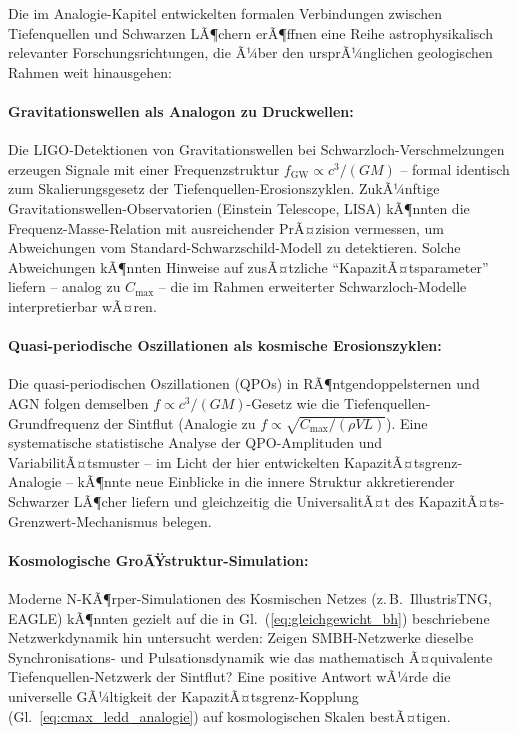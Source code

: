 ﻿\documentclass[12pt,a4paper]{report}
\begin{document}
Die im Analogie-Kapitel entwickelten formalen Verbindungen zwischen Tiefenquellen und Schwarzen LÃ¶chern erÃ¶ffnen eine Reihe astrophysikalisch relevanter Forschungsrichtungen, die Ã¼ber den ursprÃ¼nglichen geologischen Rahmen weit hinausgehen:

\paragraph{Gravitationswellen als Analogon zu Druckwellen:}
Die LIGO-Detektionen von Gravitationswellen bei Schwarzloch-Verschmelzungen \cite{abbott2016ligo} erzeugen Signale mit einer Frequenzstruktur $f_{\mathrm{GW}} \propto c^3/(GM)$ -- formal identisch zum Skalierungsgesetz der Tiefenquellen-Erosionszyklen. ZukÃ¼nftige Gravitationswellen-Observatorien (Einstein Telescope, LISA) kÃ¶nnten die Frequenz-Masse-Relation mit ausreichender PrÃ¤zision vermessen, um Abweichungen vom Standard-Schwarzschild-Modell zu detektieren. Solche Abweichungen kÃ¶nnten Hinweise auf zusÃ¤tzliche ``KapazitÃ¤tsparameter'' liefern -- analog zu $C_{\max}$ -- die im Rahmen erweiterter Schwarzloch-Modelle interpretierbar wÃ¤ren.

\paragraph{Quasi-periodische Oszillationen als kosmische Erosionszyklen:}
Die quasi-perio\-dischen Oszillationen (QPOs) in RÃ¶ntgendoppelsternen \cite{strohmayer2001} und AGN folgen demselben $f \propto c^3/(GM)$-Gesetz wie die Tiefenquellen-Grundfrequenz der Sintflut (Analogie zu $f \propto \sqrt{C_{\max}/(\rho V L)}$). Eine systematische statistische Analyse der QPO-Amplituden und VariabilitÃ¤tsmuster -- im Licht der hier entwickelten KapazitÃ¤tsgrenz-Analogie -- kÃ¶nnte neue Einblicke in die innere Struktur akkretierender Schwarzer LÃ¶cher liefern und gleichzeitig die UniversalitÃ¤t des KapazitÃ¤ts-Grenzwert-Mechanismus belegen.

\paragraph{Kosmologische GroÃŸstruktur-Simulation:}
Moderne N-KÃ¶rper-Simulationen des Kosmischen Netzes (z.\,B.\ IllustrisTNG, EAGLE) kÃ¶nnten gezielt auf die in Gl.~(\ref{eq:gleichgewicht_bh}) beschriebene Netzwerkdynamik hin untersucht werden: Zeigen SMBH-Netzwerke dieselbe Synchronisations- und Pulsationsdynamik wie das mathematisch Ã¤quivalente Tiefenquellen-Netzwerk der Sintflut? Eine positive Antwort wÃ¼rde die universelle GÃ¼ltigkeit der KapazitÃ¤tsgrenz-Kopplung (Gl.~\ref{eq:cmax_ledd_analogie}) auf kosmologischen Skalen bestÃ¤tigen.
\end{document}
